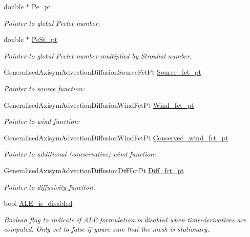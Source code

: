 \begin{DoxyCompactItemize}
\item 
double $\ast$ \hyperlink{namespaceoomph_ae8c74390a52fa2e57b6ef898649fdfff}{Pe\+\_\+pt}
\begin{DoxyCompactList}\small\item\em Pointer to global Peclet number. \end{DoxyCompactList}\item 
double $\ast$ \hyperlink{namespaceoomph_a54db0b0b7bccb80aa5110f4d86758dd5}{Pe\+St\+\_\+pt}
\begin{DoxyCompactList}\small\item\em Pointer to global Peclet number multiplied by Strouhal number. \end{DoxyCompactList}\item 
Generalised\+Axisym\+Advection\+Diffusion\+Source\+Fct\+Pt \hyperlink{namespaceoomph_a051e9244ca4fd64439699c8e7e7bcf09}{Source\+\_\+fct\+\_\+pt}
\begin{DoxyCompactList}\small\item\em Pointer to source function\+: \end{DoxyCompactList}\item 
Generalised\+Axisym\+Advection\+Diffusion\+Wind\+Fct\+Pt \hyperlink{namespaceoomph_a9065bf486c804884097785e02883f377}{Wind\+\_\+fct\+\_\+pt}
\begin{DoxyCompactList}\small\item\em Pointer to wind function\+: \end{DoxyCompactList}\item 
Generalised\+Axisym\+Advection\+Diffusion\+Wind\+Fct\+Pt \hyperlink{namespaceoomph_a2453d7b0c71b0b9039b1f025226fad27}{Conserved\+\_\+wind\+\_\+fct\+\_\+pt}
\begin{DoxyCompactList}\small\item\em Pointer to additional (conservative) wind function\+: \end{DoxyCompactList}\item 
Generalised\+Axisym\+Advection\+Diffusion\+Diff\+Fct\+Pt \hyperlink{namespaceoomph_a213e9eeb52fa6ea98254de45f1ba4f98}{Diff\+\_\+fct\+\_\+pt}
\begin{DoxyCompactList}\small\item\em Pointer to diffusivity funciton. \end{DoxyCompactList}\item 
bool \hyperlink{namespaceoomph_ae5302eaf07e49e53147c42e2e6450eff}{A\+L\+E\+\_\+is\+\_\+disabled}
\begin{DoxyCompactList}\small\item\em Boolean flag to indicate if A\+LE formulation is disabled when time-\/derivatives are computed. Only set to false if you\textquotesingle{}re sure that the mesh is stationary. \end{DoxyCompactList}\item 

\end{DoxyCompactItemize}
